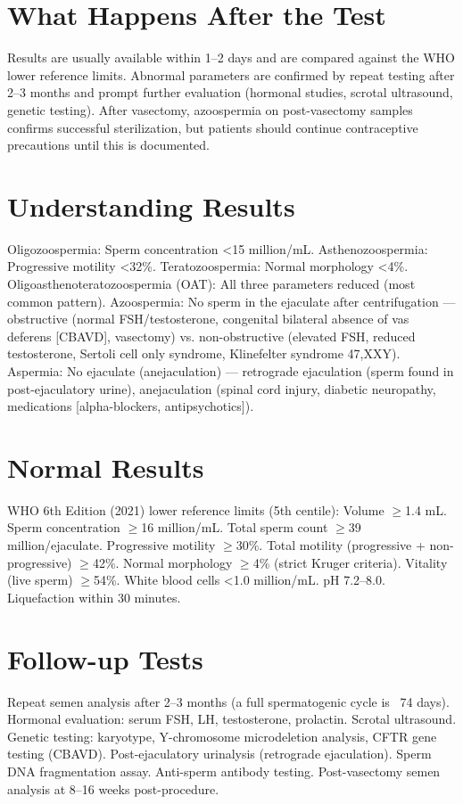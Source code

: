 \section*{What Happens After the Test}
Results are usually available within 1--2 days and are compared against the WHO lower reference limits. Abnormal parameters are confirmed by repeat testing after 2--3 months and prompt further evaluation (hormonal studies, scrotal ultrasound, genetic testing). After vasectomy, azoospermia on post-vasectomy samples confirms successful sterilization, but patients should continue contraceptive precautions until this is documented.
\section*{Understanding Results}
Oligozoospermia: Sperm concentration <15 million/mL. Asthenozoospermia: Progressive motility <32\%. Teratozoospermia: Normal morphology <4\%. Oligoasthenoteratozoospermia (OAT): All three parameters reduced (most common pattern). Azoospermia: No sperm in the ejaculate after centrifugation --- obstructive (normal FSH/testosterone, congenital bilateral absence of vas deferens [CBAVD], vasectomy) vs. non-obstructive (elevated FSH, reduced testosterone, Sertoli cell only syndrome, Klinefelter syndrome 47,XXY). Aspermia: No ejaculate (anejaculation) --- retrograde ejaculation (sperm found in post-ejaculatory urine), anejaculation (spinal cord injury, diabetic neuropathy, medications [alpha-blockers, antipsychotics]).
\section*{Normal Results}
WHO 6th Edition (2021) lower reference limits (5th centile): Volume $\geq$1.4 mL. Sperm concentration $\geq$16 million/mL. Total sperm count $\geq$39 million/ejaculate. Progressive motility $\geq$30\%. Total motility (progressive + non-progressive) $\geq$42\%. Normal morphology $\geq$4\% (strict Kruger criteria). Vitality (live sperm) $\geq$54\%. White blood cells <1.0 million/mL. pH 7.2--8.0. Liquefaction within 30 minutes.
\section*{Follow-up Tests}
Repeat semen analysis after 2--3 months (a full spermatogenic cycle is ~74 days). Hormonal evaluation: serum FSH, LH, testosterone, prolactin. Scrotal ultrasound. Genetic testing: karyotype, Y-chromosome microdeletion analysis, CFTR gene testing (CBAVD). Post-ejaculatory urinalysis (retrograde ejaculation). Sperm DNA fragmentation assay. Anti-sperm antibody testing. Post-vasectomy semen analysis at 8--16 weeks post-procedure.
